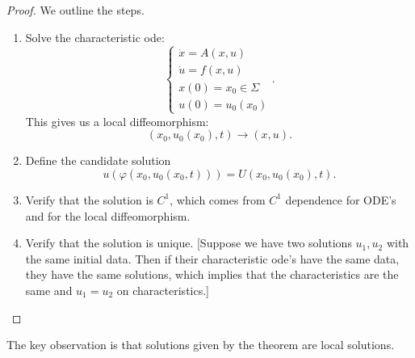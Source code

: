 \documentclass[12pt]{scrartcl}
\let \phi \varphi
\begin{document}
\begin{proof} We outline the steps.
\begin{enumerate}
\item Solve the characteristic ode:
$$\begin{cases}
\dot{x} = A(x, u)\\
\dot{u} = f(x, u)\\
x(0) = x_0 \in \Sigma \\
u(0) = u_0(x_0)
\end{cases}.$$
This gives us a local diffeomorphism:
$$(x_0, u_0(x_0), t) \rightarrow (x, u).$$
\item Define the candidate solution
$$u(\phi(x_0, u_0(x_0, t))) = U(x_0, u_0(x_0), t).$$
\item Verify that the solution is $C^1$, which comes from $C^1$ dependence for ODE's and for the local diffeomorphism.
\item Verify that the solution is unique.  [Suppose we have two solutions $u_1, u_2$ with the same initial data.   Then if their characteristic ode's have the same data, they have the same solutions, which implies that the characteristics are the same and $u_1 = u_2$ on characteristics.]
\end{enumerate}
\end{proof}
The key observation is that solutions given by the theorem are local solutions.
\end{document}
